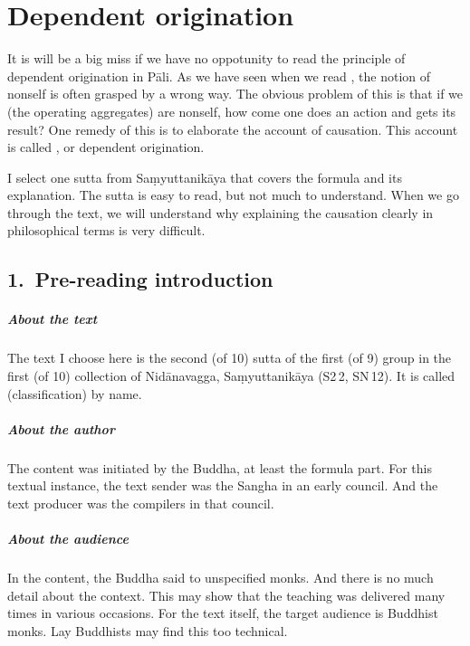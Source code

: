 \chapter{Dependent origination}\label{chap:paticca}

It is will be a big miss if we have no oppotunity to read the principle of dependent origination in P\=ali. As we have seen when we read , the notion of nonself is often grasped by a wrong way. The obvious problem of this is that if we (the operating aggregates) are nonself, how come one does an action and gets its result? One remedy of this is to elaborate the account of causation. This account is called , or dependent origination.

I select one sutta from Sa\d myuttanik\=aya that covers the formula and its explanation. The sutta is easy to read, but not much to understand. When we go through the text, we will understand why explaining the causation clearly in philosophical terms is very difficult.

{}
\section*{1.\ Pre-reading introduction}

\paragraph*{About the text} The text I choose here is the second (of 10) sutta of the first (of 9) group in the first (of 10) collection of Nid\=anavagga, Sa\d myuttanik\=aya (S2\,2, SN\,12). It is called  (classification) by name.

\paragraph*{About the author} The content was initiated by the Buddha, at least the formula part. For this textual instance, the text sender was the Sangha in an early council. And the text producer was the compilers in that council.

\paragraph*{About the audience} In the content, the Buddha said to unspecified monks. And there is no much detail about the context. This may show that the teaching was delivered many times in various occasions. For the text itself, the target audience is Buddhist monks. Lay Buddhists may find this too technical.
 
